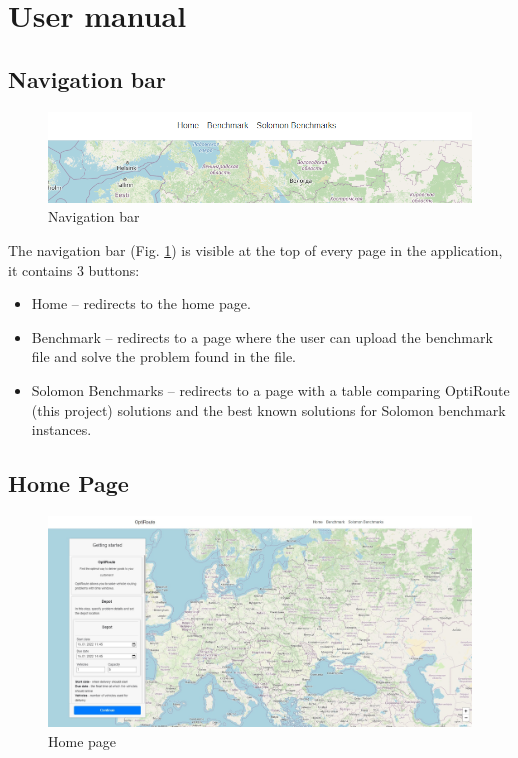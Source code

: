 \documentclass[a4paper,twoside,12pt]{book}
\begin{document}
\section{User manual}
\subsection{Navigation bar}
\begin{figure}[H]
\centering
\includegraphics[width=\textwidth]{images/navbar_updated.png}
\caption{Navigation bar}
\label{fig:navbar}
\end{figure}

The navigation bar (Fig. \ref{fig:navbar}) is visible at the top of every page in the application, it contains 3 buttons:
\begin{itemize}
\item Home -- redirects to the home page.
\item Benchmark -- redirects to a page where the user can upload the benchmark file and solve the problem found in the file.
\item Solomon Benchmarks -- redirects to a page with a table comparing OptiRoute (this project) solutions and the best known solutions for Solomon benchmark instances.
\end{itemize}

\subsection{Home Page}
\begin{figure}[H]
\centering
\includegraphics[width=\textwidth]{images/home.jpg}
\caption{Home page}
\label{fig:home}
\end{figure}
\end{document}
